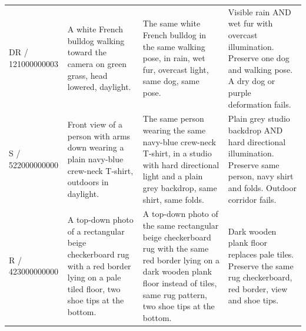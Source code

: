 \begin{longtable}{p{.14\linewidth}p{.26\linewidth}p{.27\linewidth}p{.25\linewidth}}
DR / 121000000003 & A white French bulldog walking toward the camera on green grass, head lowered, daylight. & The same white French bulldog in the same walking pose, in rain, wet fur, overcast light, same dog, same pose. & Visible rain AND wet fur with overcast illumination. Preserve one dog and walking pose. A dry dog or purple deformation fails. \\
S / 522000000000 & Front view of a person with arms down wearing a plain navy-blue crew-neck T-shirt, outdoors in daylight. & The same person wearing the same navy-blue crew-neck T-shirt, in a studio with hard directional light and a plain grey backdrop, same shirt, same folds. & Plain grey studio backdrop AND hard directional illumination. Preserve same person, navy shirt and folds. Outdoor corridor fails. \\
R / 423000000000 & A top-down photo of a rectangular beige checkerboard rug with a red border lying on a pale tiled floor, two shoe tips at the bottom. & A top-down photo of the same rectangular beige checkerboard rug with the same red border lying on a dark wooden plank floor instead of tiles, same rug pattern, two shoe tips at the bottom. & Dark wooden plank floor replaces pale tiles. Preserve the same rug checkerboard, red border, view and shoe tips. \\
\hline\end{longtable}
\endgroup

